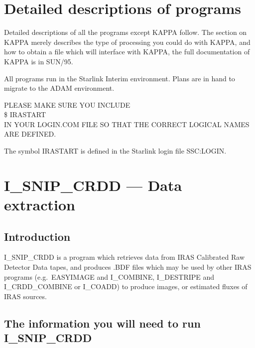 \section {Detailed descriptions of programs}


Detailed descriptions of all the programs except KAPPA follow. The section on
KAPPA merely describes the type of processing you could do with KAPPA, and how
to obtain a file which will interface with KAPPA, the full documentation of
KAPPA is in SUN/95.

All programs run in the Starlink Interim environment. Plans are in hand to
migrate to the ADAM environment.

\begin{center}
\large{PLEASE MAKE SURE YOU INCLUDE
\\
\$ IRASTART
\\
IN YOUR LOGIN.COM FILE SO THAT THE CORRECT LOGICAL NAMES ARE DEFINED.}
\end{center}
The symbol IRASTART is defined in the Starlink login file SSC:LOGIN.

\pagebreak
\section {I\_SNIP\_CRDD --- Data extraction}

\subsection {Introduction}

I\_SNIP\_CRDD is a program which retrieves data from IRAS Calibrated Raw
Detector Data tapes, and produces .BDF files which may be used by other IRAS
programs (e.g.\ EASYIMAGE and I\_COMBINE, I\_DESTRIPE and I\_CRDD\_COMBINE or
I\_COADD) to produce images, or estimated fluxes of IRAS sources.


\subsection {The information you will need to run I\_SNIP\_CRDD}

